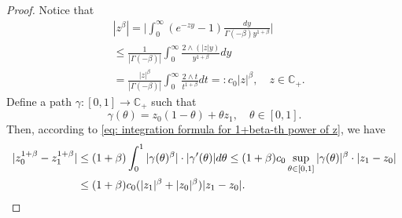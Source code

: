 \documentclass[12pt, a4paper]{amsart}
\theoremstyle{definition}
\numberwithin{equation}{section}
\begin{document}
\begin{proof}
    Notice that
\begin{align}
\label{eq: upper bound for beta power of z}
    &|z^{\beta}|
    = \Big|\int_0^\infty (e^{-zy}-1) \frac{dy}{\Gamma(-\beta)y^{1+\beta}}\Big|
    \\&\leq \frac{1}{|\Gamma(-\beta)|}\int_0^\infty \frac{2\wedge (|z|y)}{y^{1+\beta}}dy
    \\&= \frac{|z|^{\beta}}{|\Gamma(-\beta)|}\int_0^\infty \frac{2\wedge t}{t^{1+\beta}}dt =: c_0 |z|^{\beta},
    \quad z\in \mathbb C_+.
\end{align}
    Define a path $\gamma: [0,1] \to \mathbb C_+$ such that
\[
    \gamma(\theta)
    = z_0 (1-\theta) + \theta z_1,
    \quad \theta \in [0,1].
\]
    Then, according to \eqref{eq: integration formula for 1+beta-th power of z}, we have
\begin{align}
    |z_0^{1+\beta} - z_1^{1+\beta}|
    &\leq (1+\beta) \int_0^1 |\gamma(\theta)^{\beta}|\cdot |\gamma'(\theta)|d\theta
    \leq (1+\beta) c_0 \sup_{\theta \in [0,1]} |\gamma(\theta)|^{\beta} \cdot |z_1-z_0|
    \\&\leq (1+\beta) c_0 ( |z_1|^{\beta}+|z_0|^{\beta} ) |z_1-z_0|.
    \qedhere
\end{align}
\end{proof}
\end{document}
